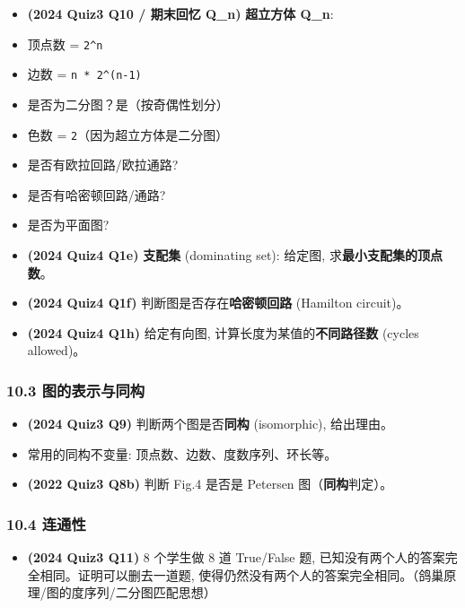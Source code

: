\documentclass[10pt,a4paper,openany]{ctexbook}
\theoremstyle{definition}
\theoremstyle{remark}
\begin{document}
\begin{itemize}
\item \textbf{(2024 Quiz3 Q10 / 期末回忆 Q\_n)} \textbf{超立方体 Q\_n}:
\item 顶点数 = \texttt{2\^{}n}
\item 边数 = \texttt{n * 2\^{}(n-1)}
\item 是否为二分图？是（按奇偶性划分）
\item 色数 = \texttt{2}（因为超立方体是二分图）
\item 是否有欧拉回路/欧拉通路?
\item 是否有哈密顿回路/通路?
\item 是否为平面图?

\item \textbf{(2024 Quiz4 Q1e)} \textbf{支配集} (dominating set): 给定图, 求\textbf{最小支配集的顶点数}。
\item \textbf{(2024 Quiz4 Q1f)} 判断图是否存在\textbf{哈密顿回路} (Hamilton circuit)。
\item \textbf{(2024 Quiz4 Q1h)} 给定有向图, 计算长度为某值的\textbf{不同路径数} (cycles allowed)。

\end{itemize}

\subsubsection{10.3 图的表示与同构}

\begin{itemize}
\item \textbf{(2024 Quiz3 Q9)} 判断两个图是否\textbf{同构} (isomorphic), 给出理由。
\item 常用的同构不变量: 顶点数、边数、度数序列、环长等。
\item \textbf{(2022 Quiz3 Q8b)} 判断 Fig.4 是否是 Petersen 图（\textbf{同构}判定）。

\end{itemize}

\subsubsection{10.4 连通性}

\begin{itemize}
\item \textbf{(2024 Quiz3 Q11)} 8 个学生做 8 道 True/False 题, 已知没有两个人的答案完全相同。证明可以删去一道题, 使得仍然没有两个人的答案完全相同。（鸽巢原理/图的度序列/二分图匹配思想）

\end{itemize}
\end{document}
